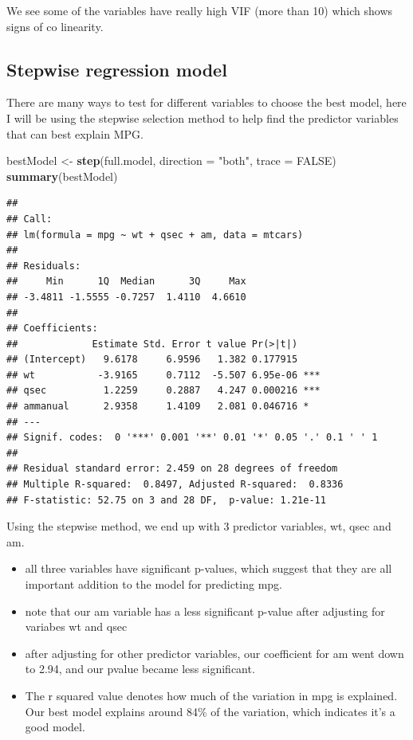\documentclass[
]{article}
\newenvironment{Shaded}{\begin{snugshade}}{\end{snugshade}}
\newcommand{\AttributeTok}[1]{\textcolor[rgb]{0.13,0.29,0.53}{#1}}
\newcommand{\ConstantTok}[1]{\textcolor[rgb]{0.56,0.35,0.01}{#1}}
\newcommand{\FunctionTok}[1]{\textcolor[rgb]{0.13,0.29,0.53}{\textbf{#1}}}
\newcommand{\NormalTok}[1]{#1}
\newcommand{\OtherTok}[1]{\textcolor[rgb]{0.56,0.35,0.01}{#1}}
\newcommand{\StringTok}[1]{\textcolor[rgb]{0.31,0.60,0.02}{#1}}
\providecommand{\tightlist}{%
  \setlength{\itemsep}{0pt}\setlength{\parskip}{0pt}}
\begin{document}
We see some of the variables have really high VIF (more than 10) which
shows signs of co linearity.

\subsection{Stepwise regression model}\label{stepwise-regression-model}

There are many ways to test for different variables to choose the best
model, here I will be using the stepwise selection method to help find
the predictor variables that can best explain MPG.

\begin{Shaded}
\begin{Highlighting}[]
\NormalTok{bestModel }\OtherTok{\textless{}{-}} \FunctionTok{step}\NormalTok{(full.model, }\AttributeTok{direction =} \StringTok{"both"}\NormalTok{,}
                  \AttributeTok{trace =} \ConstantTok{FALSE}\NormalTok{)}
\FunctionTok{summary}\NormalTok{(bestModel)}
\end{Highlighting}
\end{Shaded}

\begin{verbatim}
## 
## Call:
## lm(formula = mpg ~ wt + qsec + am, data = mtcars)
## 
## Residuals:
##     Min      1Q  Median      3Q     Max 
## -3.4811 -1.5555 -0.7257  1.4110  4.6610 
## 
## Coefficients:
##             Estimate Std. Error t value Pr(>|t|)    
## (Intercept)   9.6178     6.9596   1.382 0.177915    
## wt           -3.9165     0.7112  -5.507 6.95e-06 ***
## qsec          1.2259     0.2887   4.247 0.000216 ***
## ammanual      2.9358     1.4109   2.081 0.046716 *  
## ---
## Signif. codes:  0 '***' 0.001 '**' 0.01 '*' 0.05 '.' 0.1 ' ' 1
## 
## Residual standard error: 2.459 on 28 degrees of freedom
## Multiple R-squared:  0.8497, Adjusted R-squared:  0.8336 
## F-statistic: 52.75 on 3 and 28 DF,  p-value: 1.21e-11
\end{verbatim}

Using the stepwise method, we end up with 3 predictor variables, wt,
qsec and am.

\begin{itemize}
\tightlist
\item
  all three variables have significant p-values, which suggest that they
  are all important addition to the model for predicting mpg.
\item
  note that our am variable has a less significant p-value after
  adjusting for variabes wt and qsec
\item
  after adjusting for other predictor variables, our coefficient for am
  went down to 2.94, and our pvalue became less significant.
\item
  The r squared value denotes how much of the variation in mpg is
  explained. Our best model explains around 84\% of the variation, which
  indicates it's a good model.
\end{itemize}
\end{document}
